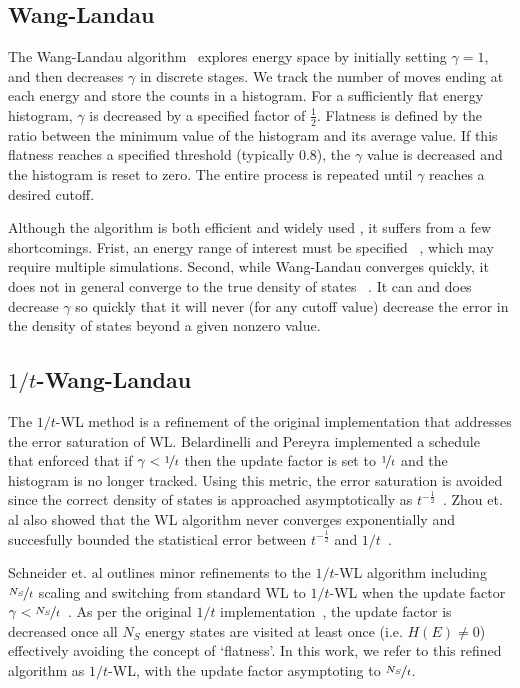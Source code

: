 \documentclass[letterpaper,twocolumn,amsmath,amssymb,pre,aps,10pt]{revtex4-1}
\begin{document}
\subsection{Wang-Landau}
The Wang-Landau algorithm~\cite{wang2001efficient,wang2001determining,
landau2014guide} explores energy space by initially setting $\gamma=1$,
and then decreases $\gamma$ in discrete stages.  We track the number of
moves ending at each energy and store the counts in a histogram.  For a
sufficiently flat energy histogram, $\gamma$ is decreased by a specified factor of
$\frac12$.  Flatness is defined by the ratio between the minimum
value of the histogram and its average value.  If this flatness
reaches a specified threshold (typically 0.8), the $\gamma$ value is
decreased and the histogram is reset to zero. The entire process is repeated
until $\gamma$ reaches a desired cutoff.

Although the algorithm is both efficient and widely used , it
suffers from a few shortcomings.  Frist, an energy range of interest must be
specified ~\cite{wang2001efficient, schulz2003avoiding, yan2003fast},
which may require multiple simulations. Second, while Wang-Landau
converges quickly, it does not in general converge to the true density
of states ~\cite{belardinelli2008analysis, zhou2008optimal}.  It can
and does decrease $\gamma$ so quickly that it will never (for any
cutoff value) decrease the error in the density of states beyond a
given nonzero value.

\subsection{$1/t$-Wang-Landau}
The $1/t$-WL method is a refinement of the original implementation that
addresses the error saturation of WL. Belardinelli and Pereyra
implemented a schedule~\cite{belardinelli2007fast} that enforced that
if $\gamma < \nicefrac{1}{t}$ then the update factor is set to
$\nicefrac{1}{t}$ and the histogram is no longer tracked. Using this
metric, the error saturation is avoided since the correct density of
states is approached asymptotically as
$t^{-\frac12}$~\cite{belardinelli2008analysis}. Zhou et. al also showed
that the WL algorithm never converges exponentially and succesfully
bounded the statistical error between $t^{-\frac12}$ and
$1/t$~\cite{zhou2008optimal}.  

Schneider $\text{et. al}$ outlines minor refinements to the $1/t$-WL algorithm 
including $\nicefrac{N_S}{t}$ scaling and switching from standard WL to 
$1/t$-WL when the update factor $\gamma < 
\nicefrac{N_S}{t}$~\cite{schneider2017convergence}. As per the original 
$1/t$ implementation~\cite{belardinelli2007fast}, the update factor is 
decreased once all $N_S$ energy states are visited at least once (i.e. 
$H(E) \neq 0$) effectively avoiding the concept of `flatness'.  In this 
work, we refer to this refined algorithm as $1/t$-WL, with the update 
factor asymptoting to $\nicefrac{N_S}{t}$.
\end{document}
